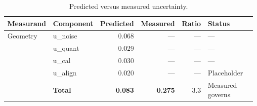 \begin{table}[htbp]
\centering
\caption{Predicted versus measured uncertainty.}
\label{tab:uncertainty}
\begin{tabular}{@{}llrrrl@{}}
\toprule
Measurand & Component & Predicted & Measured & Ratio & Status \\
\midrule
Geometry & u\_noise & 0.068 & --- & --- & --- \\
         & u\_quant & 0.029 & --- & --- & --- \\
         & u\_cal   & 0.030 & --- & --- & --- \\
         & u\_align & 0.020 & --- & --- & Placeholder \\
         & \textbf{Total} & \textbf{0.083} & \textbf{0.275} & 3.3 & Measured governs \\
\bottomrule
\end{tabular}
\end{table}
